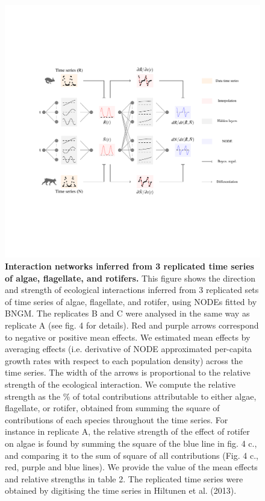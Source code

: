 \documentclass[11pt, oneside]{article}
\begin{document}
\newpage
\begin{figure}[H]
\includegraphics[width=1\linewidth,page=6]{figures/main.pdf}
\caption{
    \textbf{Interaction networks inferred from 3 replicated time series of algae, flagellate, and rotifers.}
    This figure shows the direction and strength of ecological interactions inferred from 3 replicated sets of time series of algae, flagellate, and rotifer, using NODEs fitted by BNGM.
    The replicates B and C were analysed in the same way as replicate A (see fig. 4 for details).
    Red and purple arrows correspond to negative or positive mean effects. 
    We estimated mean effects by averaging effects (i.e. derivative of NODE approximated per-capita growth rates with respect to each population density) across the time series.
    The width of the arrows is proportional to the relative strength of the ecological interaction. 
    We compute the relative strength as the \% of total contributions attributable to either algae, flagellate, or rotifer, obtained from summing the square of contributions of each species throughout the time series.
    For instance in replicate A, the relative strength of the effect of rotifer on algae is found by summing the square of the blue line in fig. 4 c., and comparing it to the sum of square of all contributions (Fig. 4 c., red, purple and blue lines).
    We provide the value of the mean effects and relative strengths in table 2.
    The replicated time series were obtained by digitising the time series in Hiltunen et al. (2013).
}
\end{figure}
\newpage
\end{document}
